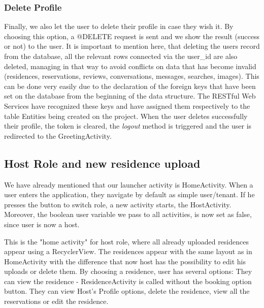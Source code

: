 \documentclass[12pt]{article}
\begin{document}
	\subsubsection{Delete Profile}
	Finally, we also let the user to delete their profile in case they wish it. By choosing this option, a @DELETE request is sent and we show the result (success or not) to the user. It is important to mention here, that deleting the users record from the database, all the relevant rows connected via the user\_id are also deleted, managing in that way to avoid conflicts on data that has become invalid (residences, reservations, reviews, conversations, messages, searches, images). This can be done very easily due to the declaration of the foreign keys that have been set on the database from the beginning of the data structure. The RESTful Web Services have recognized these keys and have assigned them respectively to the table Entities being created on the project. When the user deletes successfully their profile, the token is cleared, the \textit{logout} method is triggered and the user is redirected to the GreetingActivity.
	
	\subsection{Host Role and new residence upload}
	
	We have already mentioned that our launcher activity is HomeActivity. When a user enters the application, they navigate by default as simple user/tenant. If he presses the button to switch role, a new activity starts, the HostActivity. Moreover, the boolean user variable we pass to all activities, is now set as false, since user is now a host.
	
	This is the "home activity" for host role, where all already uploaded residences appear using a RecyclerView. The residences appear with the same layout as in HomeActivity with the difference that now host has the possibility to edit his uploads or delete them. By choosing a residence, user has several options: They can view the residence - ResidenceActivity is called without the booking option button. They can view Host's Profile options, delete the residence, view all the reservations or edit the residence.
	
\end{document}
